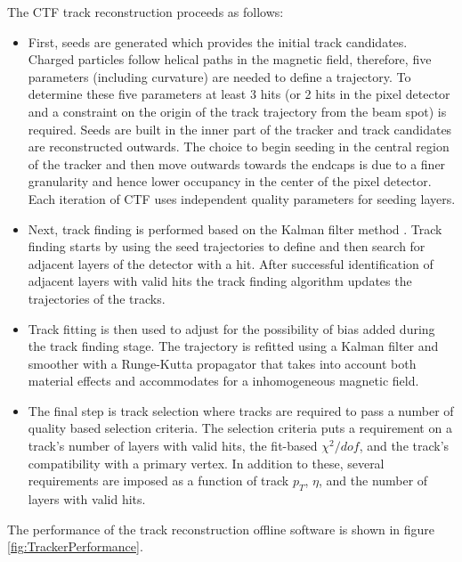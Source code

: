 The CTF track reconstruction proceeds as follows:
\begin{itemize}
\item First, seeds are generated which provides the initial track candidates.
Charged particles follow helical paths in the magnetic field, therefore, five parameters (including curvature)
are needed to define a trajectory. To determine these five parameters at least
3 hits (or 2 hits in the pixel detector and a constraint on the origin of the track trajectory from the beam
spot) is required. Seeds are built in the inner part of the tracker
and track candidates are reconstructed outwards. 
The choice to begin seeding in the central region of the tracker and
then move outwards towards the endcaps is due to a finer granularity 
and hence lower occupancy in the center of the pixel detector. Each iteration of CTF
uses independent quality parameters for seeding layers. 
\item Next, track finding is performed based on the Kalman filter method \cite{KalmanFilter}.
Track finding starts by using the seed trajectories to define and then search
for adjacent layers of the detector with a hit. 
After successful identification of adjacent layers with valid hits 
the track finding algorithm updates the trajectories of the tracks. 
\item Track fitting is then used to adjust for the possibility of bias added during the track
finding stage. The trajectory is refitted using a Kalman filter and smoother with
a Runge-Kutta propagator that takes into account both material effects and accommodates
for a inhomogeneous magnetic field.
\item The final step is track selection where tracks are required to pass a number of quality
based selection criteria. 
The selection criteria puts a requirement on a track's number of layers 
with valid hits, the fit-based $\chi^{2}/dof$, and the track's compatibility
with a primary vertex. In addition to these, several requirements are
imposed as a function of track $p_{T}$, $\eta$, and the number of layers
with valid hits. 
\end{itemize}
The performance of the track reconstruction
offline software is shown in figure \ref{fig:TrackerPerformance}.
